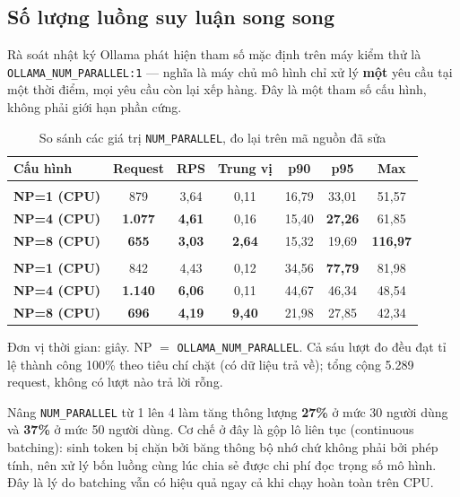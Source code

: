 \documentclass[12pt,a4paper]{article}
\newcommand{\ok}[1]{\textcolor{successgreen}{\bfseries #1}}
\newcommand{\bad}[1]{\textcolor{dangerred}{\bfseries #1}}
\begin{document}
\subsection{Số lượng luồng suy luận song song}
\label{sec:np}

Rà soát nhật ký Ollama phát hiện tham số mặc định trên máy kiểm thử là
\texttt{OLLAMA\_NUM\_PARALLEL:1} --- nghĩa là máy chủ mô hình chỉ xử lý
\textbf{một} yêu cầu tại một thời điểm, mọi yêu cầu còn lại xếp hàng. Đây là một
tham số cấu hình, không phải giới hạn phần cứng.

\begin{table}[H]
\centering
\caption{So sánh các giá trị \texttt{NUM\_PARALLEL}, đo lại trên mã nguồn đã sửa}
\label{tab:thunghiem}
\begin{tabularx}{\textwidth}{>{\bfseries}Xcccccc}
\toprule
\rowcolor{lightblue}
Cấu hình & Request & RPS & Trung vị & p90 & p95 & Max\\
\midrule
\multicolumn{7}{l}{\itshape Mức 30 người dùng}\\
NP=1 (CPU)          & 879 & 3,64 & 0,11 & 16,79 & 33,01 & 51,57\\
\rowcolor{lightblue!60}
\textbf{NP=4 (CPU)} & \ok{1.077} & \ok{4,61} & 0,16 & 15,40 & \ok{27,26} & 61,85\\
NP=8 (CPU)          & \bad{655} & \bad{3,03} & \bad{2,64} & 15,32 & 19,69 & \bad{116,97}\\
\midrule
\multicolumn{7}{l}{\itshape Mức 50 người dùng}\\
NP=1 (CPU)          & 842 & 4,43 & 0,12 & 34,56 & \bad{77,79} & 81,98\\
\rowcolor{lightblue!60}
\textbf{NP=4 (CPU)} & \ok{1.140} & \ok{6,06} & 0,11 & 44,67 & 46,34 & 48,54\\
NP=8 (CPU)          & \bad{696} & \bad{4,19} & \bad{9,40} & 21,98 & 27,85 & 42,34\\
\bottomrule
\end{tabularx}

\vspace{0.15cm}
{\small Đơn vị thời gian: giây. NP $=$ \texttt{OLLAMA\_NUM\_PARALLEL}.
Cả sáu lượt đo đều đạt tỉ lệ thành công 100\% theo tiêu chí chặt (có dữ liệu trả
về); tổng cộng 5.289 request, không có lượt nào trả lời rỗng.}
\end{table}

Nâng \texttt{NUM\_PARALLEL} từ 1 lên 4 làm tăng thông lượng \textbf{27\%} ở mức 30
người dùng và \textbf{37\%} ở mức 50 người dùng. Cơ chế ở đây là gộp lô liên tục
(continuous batching): sinh token bị chặn bởi băng thông bộ nhớ chứ không phải bởi
phép tính, nên xử lý bốn luồng cùng lúc chia sẻ được chi phí đọc trọng số mô hình.
Đây là lý do batching vẫn có hiệu quả ngay cả khi chạy hoàn toàn trên CPU.
\end{document}
